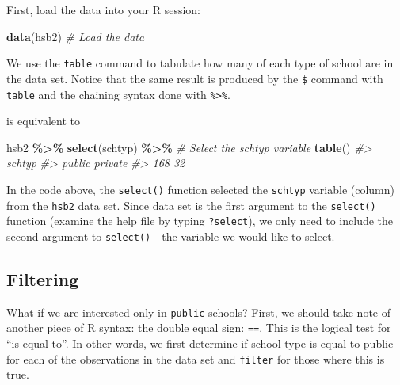 \documentclass[
  10pt,
  openany]{book}
\newenvironment{Shaded}{\begin{snugshade}}{\end{snugshade}}
\newcommand{\CommentTok}[1]{\textcolor[rgb]{0.56,0.35,0.01}{\textit{#1}}}
\newcommand{\FunctionTok}[1]{\textcolor[rgb]{0.13,0.29,0.53}{\textbf{#1}}}
\newcommand{\NormalTok}[1]{#1}
\newcommand{\SpecialCharTok}[1]{\textcolor[rgb]{0.81,0.36,0.00}{\textbf{#1}}}
\theoremstyle{definition}
\theoremstyle{definition}
\theoremstyle{definition}
\theoremstyle{definition}
\theoremstyle{remark}
\begin{document}
First, load the data into your R session:

\begin{Shaded}
\begin{Highlighting}[]
\FunctionTok{data}\NormalTok{(hsb2) }\CommentTok{\# Load the data}
\end{Highlighting}
\end{Shaded}

We use the \texttt{table} command to tabulate how many of each type
of school are in the data set. Notice that the same result is
produced by the \texttt{\$} command with \texttt{table} and the chaining
syntax done with \texttt{\%\textgreater{}\%}.

\begin{Shaded}
\end{Shaded}

is equivalent to

\begin{Shaded}
\begin{Highlighting}[]
\NormalTok{hsb2 }\SpecialCharTok{\%\textgreater{}\%}
  \FunctionTok{select}\NormalTok{(schtyp) }\SpecialCharTok{\%\textgreater{}\%} \CommentTok{\# Select the schtyp variable}
  \FunctionTok{table}\NormalTok{()}
\CommentTok{\#\textgreater{} schtyp}
\CommentTok{\#\textgreater{}  public private }
\CommentTok{\#\textgreater{}     168      32}
\end{Highlighting}
\end{Shaded}

In the code above, the \texttt{select()} function selected the \texttt{schtyp}
variable (column) from the \texttt{hsb2} data set.
Since data set is the first argument to the \texttt{select()} function
(examine the help file by typing \texttt{?select}), we only need to
include the second argument to \texttt{select()}---the variable we would
like to select.

\subsection*{Filtering}\label{filtering}

What if we are interested only in \texttt{public} schools?
First, we should take note of another piece of R syntax:
the double equal sign: \texttt{==}.
This is the logical test for ``is equal to''.
In other words, we first determine if school type is equal
to public for each of the observations in the data set and
\texttt{filter} for those where this is true.
\end{document}
